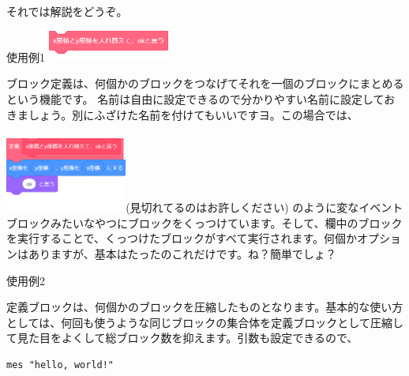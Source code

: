 \documentclass[b5paper,10pt]{jsarticle}
\begin{document}
\begin{multicols*}{3}
それでは解説をどうぞ。
\begin{itembox}{使用例1}
\includegraphics[width=4cm]{images/teigi_2.png}
\end{itembox}
ブロック定義は、何個かのブロックをつなげてそれを一個のブロックにまとめるという機能です。
名前は自由に設定できるので分かりやすい名前に設定しておきましょう。別にふざけた名前を付けてもいいですヨ。この場合では、\\\\
\includegraphics[width=4cm]{images/teigi_1.png}(見切れてるのはお許しください)
のように変なイベントブロックみたいなやつにブロックをくっつけています。そして、欄中のブロックを実行することで、くっつけたブロックがすべて実行されます。何個かオプションはありますが、基本はたったのこれだけです。ね？簡単でしょ？
\begin{itembox}{使用例2}

\end{itembox}

定義ブロックは、何個かのブロックを圧縮したものとなります。基本的な使い方としては、何回も使うような同じブロックの集合体を定義ブロックとして圧縮して見た目をよくして総ブロック数を抑えます。引数も設定できるので、


\begin{lstlisting}[caption=Sample]
mes "hello, world!"
\end{lstlisting}

\end{multicols*}
\end{document}
